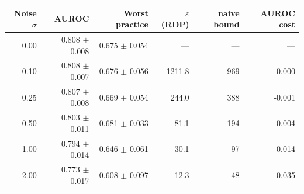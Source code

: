 \begin{tabular}{rrrrrr}
    \toprule
    Noise $\sigma$ & AUROC & Worst practice & $\varepsilon$ (RDP) & naive bound & AUROC cost \\
    \midrule
    0.00 & 0.808 $\pm$ 0.008 & 0.675 $\pm$ 0.054 & --- & --- & --- \\
    0.10 & 0.808 $\pm$ 0.007 & 0.676 $\pm$ 0.056 & 1211.8 & 969 & -0.000 \\
    0.25 & 0.807 $\pm$ 0.008 & 0.669 $\pm$ 0.054 & 244.0 & 388 & -0.001 \\
    0.50 & 0.803 $\pm$ 0.011 & 0.681 $\pm$ 0.033 & 81.1 & 194 & -0.004 \\
    1.00 & 0.794 $\pm$ 0.014 & 0.646 $\pm$ 0.061 & 30.1 & 97 & -0.014 \\
    2.00 & 0.773 $\pm$ 0.017 & 0.608 $\pm$ 0.097 & 12.3 & 48 & -0.035 \\
    \bottomrule
\end{tabular}

